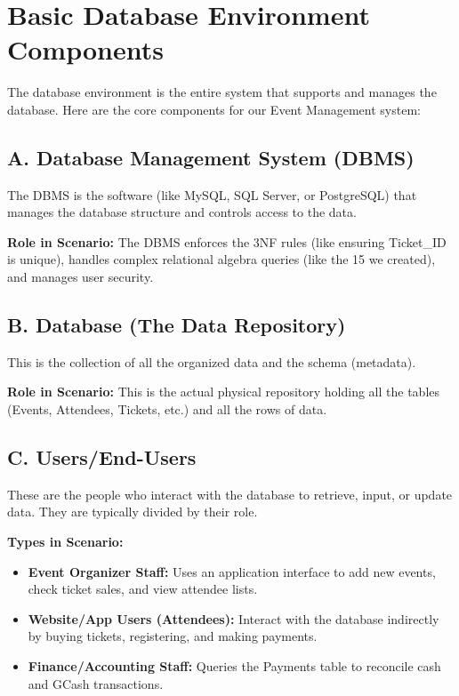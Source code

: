 \documentclass[12pt]{article}
\begin{document}
\section*{Basic Database Environment Components}

The database environment is the entire system that supports and manages the database. Here are the core components for our Event Management system:

\subsection*{A. Database Management System (DBMS)}
The DBMS is the software (like MySQL, SQL Server, or PostgreSQL) that manages the database structure and controls access to the data.

\textbf{Role in Scenario:} The DBMS enforces the 3NF rules (like ensuring Ticket\_ID is unique), handles complex relational algebra queries (like the 15 we created), and manages user security.

\subsection*{B. Database (The Data Repository)}
This is the collection of all the organized data and the schema (metadata).

\textbf{Role in Scenario:} This is the actual physical repository holding all the tables (Events, Attendees, Tickets, etc.) and all the rows of data.

\subsection*{C. Users/End-Users}
These are the people who interact with the database to retrieve, input, or update data. They are typically divided by their role.

\textbf{Types in Scenario:}
\begin{itemize}[noitemsep]
    \item \textbf{Event Organizer Staff:} Uses an application interface to add new events, check ticket sales, and view attendee lists.
    \item \textbf{Website/App Users (Attendees):} Interact with the database indirectly by buying tickets, registering, and making payments.
    \item \textbf{Finance/Accounting Staff:} Queries the Payments table to reconcile cash and GCash transactions.
\end{itemize}
\end{document}
